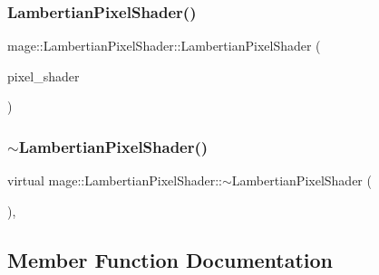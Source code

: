 \hypertarget{classmage_1_1_lambertian_pixel_shader_aadcfc17f23e4a2604703c153d8b411b8}{}\label{classmage_1_1_lambertian_pixel_shader_aadcfc17f23e4a2604703c153d8b411b8} 
\subsubsection{\texorpdfstring{Lambertian\+Pixel\+Shader()}{LambertianPixelShader()}\hspace{0.1cm}{\footnotesize\ttfamily [3/3]}}
{\footnotesize\ttfamily mage\+::\+Lambertian\+Pixel\+Shader\+::\+Lambertian\+Pixel\+Shader (\begin{DoxyParamCaption}\item[{\hyperlink{classmage_1_1_lambertian_pixel_shader}{Lambertian\+Pixel\+Shader} \&\&}]{pixel\+\_\+shader }\end{DoxyParamCaption})\hspace{0.3cm}{\ttfamily [default]}}

\hypertarget{classmage_1_1_lambertian_pixel_shader_aedea7342ae95c6532a086fb28978b5b0}{}\label{classmage_1_1_lambertian_pixel_shader_aedea7342ae95c6532a086fb28978b5b0} 
\subsubsection{\texorpdfstring{$\sim$\+Lambertian\+Pixel\+Shader()}{~LambertianPixelShader()}}
{\footnotesize\ttfamily virtual mage\+::\+Lambertian\+Pixel\+Shader\+::$\sim$\+Lambertian\+Pixel\+Shader (\begin{DoxyParamCaption}{ }\end{DoxyParamCaption})\hspace{0.3cm}{\ttfamily [virtual]}, {\ttfamily [default]}}



\subsection{Member Function Documentation}
\hypertarget{classmage_1_1_lambertian_pixel_shader_a03ae64ef13e62b33c6b6ac306207a045}{}\label{classmage_1_1_lambertian_pixel_shader_a03ae64ef13e62b33c6b6ac306207a045} 
